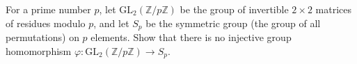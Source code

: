 \documentclass{article}
\begin{document}
\setlength{\parindent}{0pt}
For a prime number \(\displaystyle p\), let \(\displaystyle \mathrm{GL}_2(\mathbb{Z}/p\mathbb{Z})\) be the group of invertible \(\displaystyle 2 \times 2\) matrices of residues modulo \(\displaystyle p\), and let \(\displaystyle S_p\) be the symmetric group (the group of all permutations) on \(\displaystyle p\) elements. Show that there is no injective group homomorphism \(\displaystyle \varphi : \mathrm{GL}_2(\mathbb{Z}/p\mathbb{Z}) \to S_p\).
\end{document}
